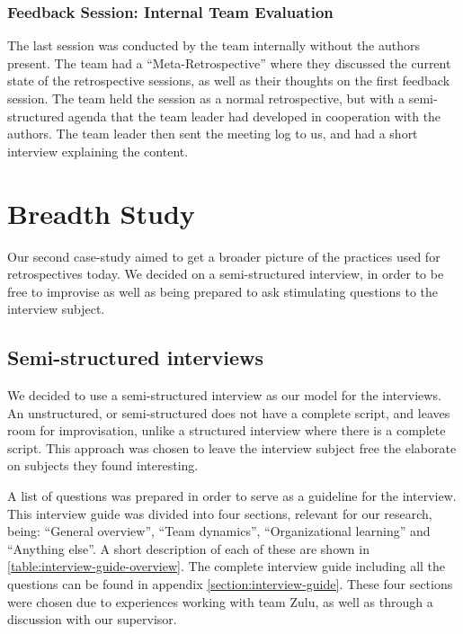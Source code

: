 \subsubsection{Feedback Session: Internal Team Evaluation}
The last session was conducted by the team internally without the authors present. The team had a ``Meta-Retrospective'' where they discussed the current state of the retrospective sessions, as well as their thoughts on the first feedback session. The team held the session as a normal retrospective, but with a semi-structured agenda that the team leader had developed in cooperation with the authors. The team leader then sent the meeting log to us, and had a short interview explaining the content.

\section{Breadth Study}
Our second case-study aimed to get a broader picture of the practices used for retrospectives today. We decided on a semi-structured interview, in order to be free to improvise as well as being prepared to ask stimulating questions to the interview subject.

\subsection{Semi-structured interviews}
We decided to use a semi-structured interview as our model for the interviews. An unstructured, or semi-structured does not have a complete script, and leaves room for improvisation, unlike a structured interview where there is a complete script. \cite{Myers2007} This approach was chosen to leave the interview subject free the elaborate on subjects they found interesting. 

A list of questions was prepared in order to serve as a guideline for the interview. This interview guide was divided into four sections, relevant for our research, being: ``General overview'', ``Team dynamics'', ``Organizational learning'' and ``Anything else''. A short description of each of these are shown in \autoref{table:interview-guide-overview}. The complete interview guide including all the questions can be found in appendix \autoref{section:interview-guide}. These four sections were chosen due to experiences working with team Zulu, as well as through a discussion with our supervisor. 

